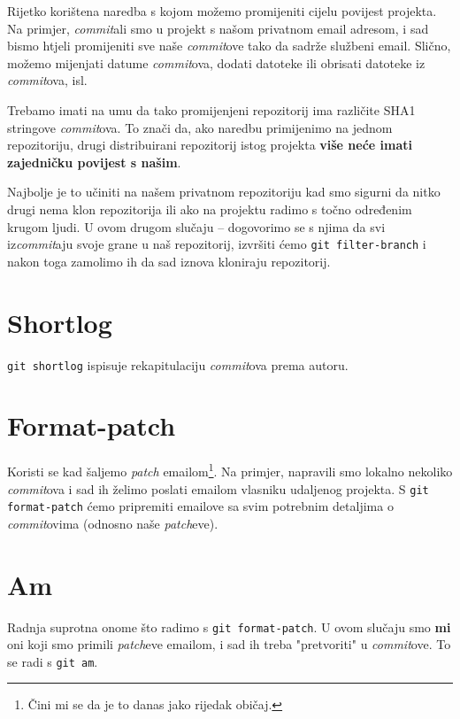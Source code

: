 Rijetko korištena naredba s kojom možemo promijeniti cijelu povijest projekta.
Na primjer, \emph{commit}ali smo u projekt s našom privatnom email adresom, i sad bismo htjeli promijeniti sve naše \emph{commit}ove tako da sadrže službeni email.
Slično, možemo mijenjati datume \emph{commit}ova, dodati datoteke ili obrisati datoteke iz \emph{commit}ova, isl.

Trebamo imati na umu da tako promijenjeni repozitorij ima različite SHA1 stringove \emph{commit}ova.
To znači da, ako naredbu primijenimo na jednom repozitoriju, drugi distribuirani repozitorij istog projekta \textbf{više neće imati zajedničku povijest s našim}.

Najbolje je to učiniti na našem privatnom repozitoriju kad smo sigurni da nitko drugi nema klon repozitorija ili ako na projektu radimo s točno određenim krugom ljudi.
U ovom drugom slučaju -- dogovorimo se s njima da svi iz\emph{commit}aju svoje grane u naš repozitorij, izvršiti ćemo \verb+git filter-branch+ i nakon toga zamolimo ih da sad iznova kloniraju repozitorij.

\section*{Shortlog}

\verb+git shortlog+ ispisuje rekapitulaciju \emph{commit}ova prema autoru.

\section*{Format-patch}

Koristi se kad šaljemo \emph{patch} emailom\footnote{Čini mi se da je to danas jako rijedak običaj.}.
Na primjer, napravili smo lokalno nekoliko \emph{commit}ova i sad ih želimo poslati emailom vlasniku udaljenog projekta.
S \verb+git format-patch+ ćemo pripremiti emailove sa svim potrebnim detaljima o \emph{commit}ovima (odnosno naše \emph{patch}eve).

\section*{Am}

Radnja suprotna onome što radimo s \verb+git format-patch+.
U ovom slučaju smo \textbf{mi} oni koji smo primili \emph{patch}eve emailom, i sad ih treba "pretvoriti" u \emph{commit}ove.
To se radi s \verb+git am+.

